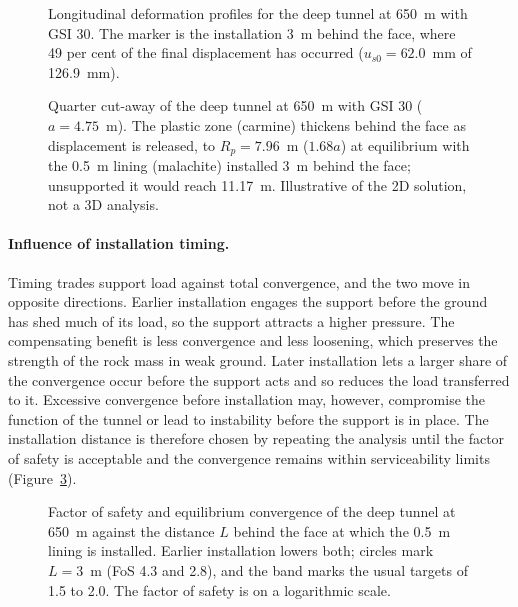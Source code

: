 \begin{figure}[htbp]
\centering
{}
\caption{Longitudinal deformation profiles for the deep tunnel at 650~m with GSI 30. The marker is the installation 3~m behind the face, where 49 per cent of the final displacement has occurred ($u_{s0} = 62.0$~mm of 126.9~mm).}
\label{fig:ldp-profiles}
\end{figure}

\begin{figure}[htbp]
\centering
{}
\caption{Quarter cut-away of the deep tunnel at 650~m with GSI 30 ($a = 4.75$~m). The plastic zone (carmine) thickens behind the face as displacement is released, to $R_p = 7.96$~m ($1.68a$) at equilibrium with the 0.5~m lining (malachite) installed 3~m behind the face; unsupported it would reach 11.17~m. Illustrative of the 2D solution, not a 3D analysis.}
\label{fig:r3d-plastic-zone}
\end{figure}

\paragraph{Influence of installation timing.}
Timing trades support load against total convergence, and the two move in
opposite directions. Earlier installation engages the support before the
ground has shed much of its load, so the support attracts a higher pressure.
The compensating benefit is less convergence and less loosening, which
preserves the strength of the rock mass in weak ground. Later installation
lets a larger share of the convergence occur before the support acts and so
reduces the load transferred to it. Excessive convergence before
installation may, however, compromise the function of the tunnel or lead to instability
before the support is in place. The installation distance is therefore
chosen by repeating the analysis until the factor of safety is acceptable and
the convergence remains within serviceability limits
(Figure~\ref{fig:install-distance}).

\begin{figure}[htbp]
\centering
{}
\caption{Factor of safety and equilibrium convergence of the deep tunnel at 650~m against the distance $L$ behind the face at which the 0.5~m lining is installed. Earlier installation lowers both; circles mark $L = 3$~m (FoS 4.3 and 2.8), and the band marks the usual targets of 1.5 to 2.0. The factor of safety is on a logarithmic scale.}
\label{fig:install-distance}
\end{figure}

